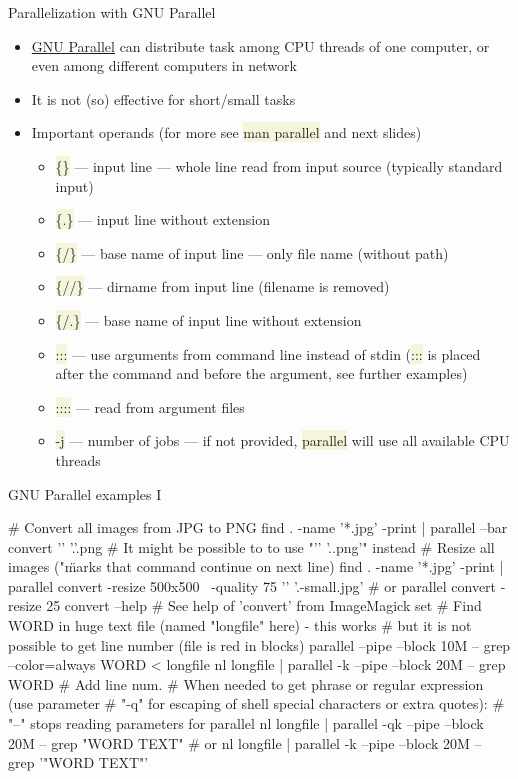 \documentclass[compress, xelatex, 11pt, xcolor=svgnames, aspectratio=169, url={hyphens, lowtilde}]{beamer}
\renewcommand{\texttt}[1]{\colorbox{Beige}{{\ttfamily #1}}}
\begin{document}
\begin{frame}{Parallelization with GNU Parallel}
	\begin{itemize}
		\item \href{https://www.gnu.org/software/parallel/}{GNU Parallel} can distribute task among CPU threads of one computer, or even among different computers in network
		\item It is not (so) effective for short/small tasks
		\item Important operands (for more see \texttt{man parallel} and next slides)
		\begin{itemize}
			\item \texttt{\{\}} --- input line --- whole line read from input source (typically standard input)
			\item \texttt{\{.\}} --- input line without extension
			\item \texttt{\{/\}} --- base name of input line --- only file name (without path)
			\item \texttt{\{//\}} --- dirname from input line (filename is removed)
			\item \texttt{\{/.\}} --- base name of input line without extension
			\item \texttt{:::} --- use arguments from command line instead of stdin (\texttt{:::} is placed after the command and before the argument, see further examples)
			\item \texttt{::::} --- read from argument files
			\item \texttt{-j} --- number of jobs --- if not provided, \texttt{parallel} will use all available CPU threads
		\end{itemize}
	\end{itemize}
\end{frame}

\begin{frame}[fragile]{GNU Parallel examples I}
	\begin{bashcode}
    # Convert all images from JPG to PNG
    find . -name '*.jpg' -print | parallel --bar convert '{}' '{.}'.png
    # It might be possible to to use "'{}' '{.}.png'" instead
    # Resize all images ("\" marks that command continue on next line)
    find . -name '*.jpg' -print | parallel convert -resize 500x500 \
      -quality 75 '{}' '{.}-small.jpg' # or
    parallel convert -resize 25%
    convert --help # See help of 'convert' from ImageMagick set
    # Find WORD in huge text file (named "longfile" here) - this works
    # but it is not possible to get line number (file is red in blocks)
    parallel --pipe --block 10M -- grep --color=always WORD < longfile
    nl longfile | parallel -k --pipe --block 20M -- grep WORD # Add line num.
    # When needed to get phrase or regular expression (use parameter
    # "-q" for escaping of shell special characters or extra quotes):
    # "--" stops reading parameters for parallel
    nl longfile | parallel -qk --pipe --block 20M -- grep "WORD TEXT" # or
    nl longfile | parallel -k --pipe --block 20M -- grep '"WORD TEXT"'
	\end{bashcode}
\end{frame}
\end{document}
